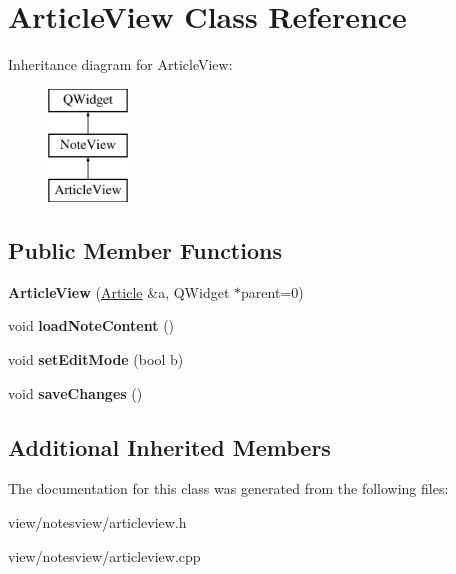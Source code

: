 \hypertarget{class_article_view}{\section{Article\-View Class Reference}
\label{class_article_view}
}
Inheritance diagram for Article\-View\-:\begin{figure}[H]
\begin{center}
\leavevmode
\includegraphics[height=3.000000cm]{class_article_view}
\end{center}
\end{figure}
\subsection*{Public Member Functions}
\begin{DoxyCompactItemize}
\item 
\hypertarget{class_article_view_a52b5e4545c11f222078eccfaf74534f6}{{\bfseries Article\-View} (\hyperlink{class_article}{Article} \&a, Q\-Widget $\ast$parent=0)}\label{class_article_view_a52b5e4545c11f222078eccfaf74534f6}

\item 
\hypertarget{class_article_view_a4fc580b70eb0b3d90b297fcbf1d866cf}{void {\bfseries load\-Note\-Content} ()}\label{class_article_view_a4fc580b70eb0b3d90b297fcbf1d866cf}

\item 
\hypertarget{class_article_view_abe514d7f17135b42e3734cc5d4bc888f}{void {\bfseries set\-Edit\-Mode} (bool b)}\label{class_article_view_abe514d7f17135b42e3734cc5d4bc888f}

\item 
\hypertarget{class_article_view_a8ae8b1921976abd932ec357d5f6753b6}{void {\bfseries save\-Changes} ()}\label{class_article_view_a8ae8b1921976abd932ec357d5f6753b6}

\end{DoxyCompactItemize}
\subsection*{Additional Inherited Members}


The documentation for this class was generated from the following files\-:\begin{DoxyCompactItemize}
\item 
view/notesview/articleview.\-h\item 
view/notesview/articleview.\-cpp\end{DoxyCompactItemize}
